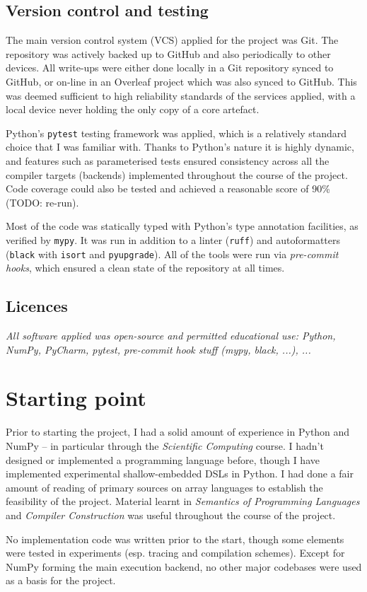\subsection{Version control and testing}

The main version control system (VCS) applied for the project was Git. The repository was actively backed up to GitHub and also periodically to other devices. All write-ups were either done locally in a Git repository synced to GitHub, or on-line in an Overleaf project which was also synced to GitHub. This was deemed sufficient to high reliability standards of the services applied, with a local device never holding the only copy of a core artefact. 

Python's \texttt{pytest} testing framework was applied, which is a relatively standard choice that I was familiar with. Thanks to Python's nature it is highly dynamic, and features such as parameterised tests ensured consistency across all the compiler targets (backends) implemented throughout the course of the project. Code coverage could also be tested and achieved a reasonable score of 90\% (TODO: re-run).

Most of the code was statically typed with Python's type annotation facilities, as verified by \texttt{mypy}. It was run in addition to a linter (\texttt{ruff}) and autoformatters (\texttt{black} with \texttt{isort} and \texttt{pyupgrade}). All of the tools were run via \textit{pre-commit hooks}, which ensured a clean state of the repository at all times.

\subsection{Licences}

\textit{All software applied was open-source and permitted educational use: Python, NumPy, PyCharm, pytest, pre-commit hook stuff (mypy, black, ...), ...}

\section{Starting point}

Prior to starting the project, I had a solid amount of experience in Python and NumPy -- in particular through the \textit{Scientific Computing} course. I hadn't designed or implemented a programming language before, though I have implemented experimental shallow-embedded DSLs in Python. I had done a fair amount of reading of primary sources on array languages to establish the feasibility of the project. Material learnt in \textit{Semantics of Programming Languages} and \textit{Compiler Construction} was useful throughout the course of the project.

No implementation code was written prior to the start, though some elements were tested in experiments (esp. tracing and compilation schemes). Except for NumPy forming the main execution backend, no other major codebases were used as a basis for the project. 
